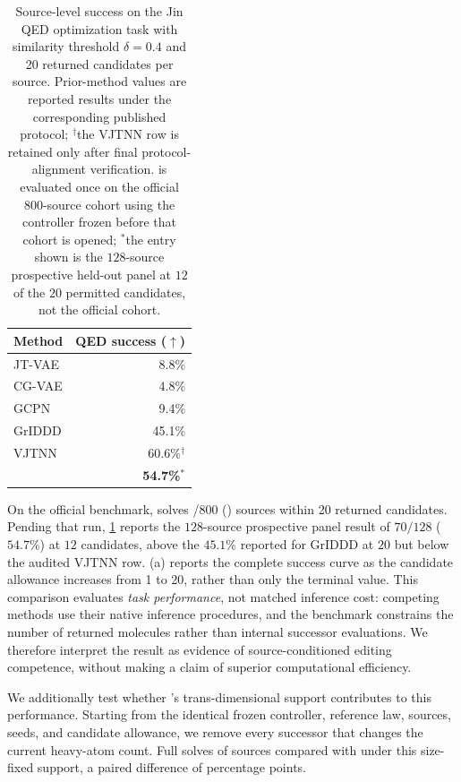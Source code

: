 \begin{table}[!ht]
\centering
{\small
\begin{tabular}{lr}
\toprule
Method & QED success ($\uparrow$) \\
\midrule
JT-VAE & 8.8\% \\
CG-VAE & 4.8\% \\
GCPN & 9.4\% \\
GrIDDD & 45.1\% \\
VJTNN & 60.6\%$^{\dagger}$ \\
\textbf{\method{}} & \textbf{54.7\%}$^{*}$ \\
\bottomrule
\end{tabular}}
\caption{\small Source-level success on the Jin QED optimization task with similarity threshold $\delta=0.4$ and 20 returned candidates per source. Prior-method values are reported results under the corresponding published protocol; $^{\dagger}$the VJTNN row is retained only after final protocol-alignment verification. \method{} is evaluated once on the official 800-source cohort using the controller frozen before that cohort is opened; $^{*}$the entry shown is the $128$-source prospective held-out panel at $12$ of the $20$ permitted candidates, not the official cohort.}
\label{tab:jin}
\end{table}

On the official benchmark, \method{} solves \XXX{}/800 (\XXX{}) sources within 20 returned candidates. Pending that run, \cref{tab:jin} reports the $128$-source prospective panel result of $70/128$ ($54.7\%$) at $12$ candidates, above the $45.1\%$ reported for GrIDDD at $20$ but below the audited VJTNN row. (a) reports the complete success curve as the candidate allowance increases from 1 to 20, rather than only the terminal value. This comparison evaluates \emph{task performance}, not matched inference cost: competing methods use their native inference procedures, and the benchmark constrains the number of returned molecules rather than internal successor evaluations. We therefore interpret the result as evidence of source-conditioned editing competence, without making a claim of superior computational efficiency.

We additionally test whether \method{}'s trans-dimensional support contributes to this performance. Starting from the identical frozen controller, reference law, sources, seeds, and candidate allowance, we remove every successor that changes the current heavy-atom count. Full \method{} solves \XXX{} of sources compared with \XXX{} under this size-fixed support, a paired difference of \XXX{} percentage points. 

